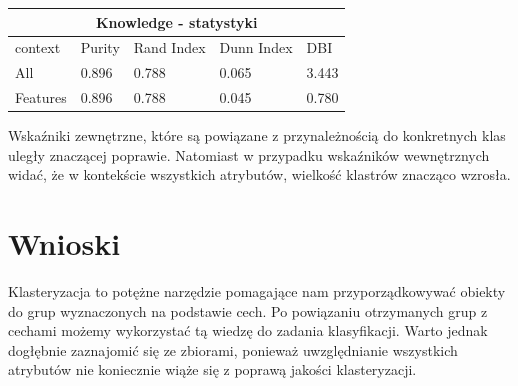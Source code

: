 \documentclass[12pt,a4paper]{article}
\begin{document}
\begin{tabular}{ |p{2.5cm}||p{2.5cm}|p{2.5cm}|p{2.5cm}|p{2.5cm}| }

\hline
\multicolumn{5}{|c|}{Knowledge - statystyki}\\
\hline
context &Purity & Rand Index & Dunn Index & DBI \\
\hline
All & 0.896 & 0.788 & 0.065 & 3.443\\
Features & 0.896 & 0.788 & 0.045 & 0.780\\
\hline
\end{tabular}

\vspace{1cm}

Wskaźniki zewnętrzne, które są powiązane z przynależnością do konkretnych klas uległy znaczącej poprawie. Natomiast w przypadku wskaźników wewnętrznych widać, że w kontekście wszystkich atrybutów, wielkość klastrów znacząco wzrosła.

\section{Wnioski}
Klasteryzacja to potężne narzędzie pomagające nam przyporządkowywać obiekty do grup wyznaczonych na podstawie cech. Po powiązaniu otrzymanych grup z cechami możemy wykorzystać tą wiedzę do zadania klasyfikacji. Warto jednak dogłębnie zaznajomić się ze zbiorami, ponieważ uwzględnianie wszystkich atrybutów nie koniecznie wiąże się z poprawą jakości klasteryzacji.
\end{document}
